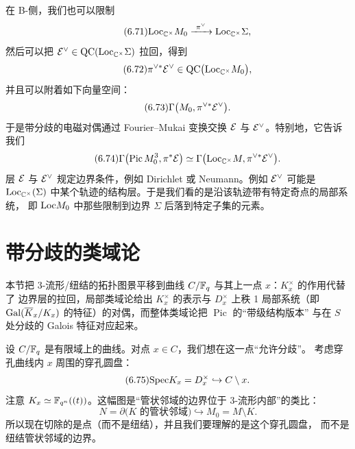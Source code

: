 在 B-侧，我们也可以限制
\begin{equation}\tag{6.71}\label{eq:6.71}
\Loc_{\C^{\times}}M_0\xrightarrow{\ \pi^{\vee}\ }\Loc_{\C^{\times}}\Sigma,
\end{equation}
然后可以把 $\mathcal{E}^{\vee}\in\mathrm{QC}(\mathrm{Loc}_{\mathbb{C}^{\times}}\Sigma)$ 拉回，得到
\begin{equation}\tag{6.72}\label{eq:6.72}
\pi^{\vee*}\mathcal{E}^{\vee}\in\mathrm{QC}\bigl(\mathrm{Loc}_{\mathbb{C}^{\times}}M_0\bigr),
\end{equation}
并且可以附着如下向量空间：
\begin{equation}\tag{6.73}\label{eq:6.73}
\Gamma\bigl(M_0,\pi^{\vee*}\mathcal{E}^{\vee}\bigr).
\end{equation}
于是带分歧的电磁对偶通过 Fourier--Mukai 变换交换 $\mathcal{E}$ 与 $\mathcal{E}^{\vee}$。特别地，它告诉我们
\begin{equation}\tag{6.74}\label{eq:6.74}
\Gamma\bigl(\operatorname{Pic}M_0^3,\pi^*\mathcal{E}\bigr)
\simeq\Gamma\bigl(\mathrm{Loc}_{\mathbb{C}^{\times}}M,\pi^{\vee*}\mathcal{E}^{\vee}\bigr).
\end{equation}
层 $\mathcal{E}$ 与 $\mathcal{E}^{\vee}$ 规定边界条件，例如 Dirichlet 或 Neumann。例如 $\mathcal{E}^{\vee}$ 可能是
$\mathrm{Loc}_{\mathbb{C}^{\times}}(\Sigma)$ 中某个轨迹的结构层。于是我们看的是沿该轨迹带有特定奇点的局部系统，
即 $\mathrm{Loc} M_0$ 中那些限制到边界 $\Sigma$ 后落到特定子集的元素。


\section{带分歧的类域论}

\begin{sectionkey}
本节把 3-流形/纽结的拓扑图景平移到曲线 $C/\mathbb{F}_q$ 与其上一点 $x$：$K_x^\times$ 的作用代替了
边界层的拉回，局部类域论给出 $K_x^\times$ 的表示与 $D_x^\times$ 上秩 1 局部系统（即
$\mathrm{Gal}(\overline{K}_x/K_x)$ 的特征）的对偶，而整体类域论把 $\operatorname{Pic}$ 的“带级结构版本”
与在 $S$ 处分歧的 Galois 特征对应起来。
\end{sectionkey}

设 $C/\mathbb{F}_q$ 是有限域上的曲线。对点 $x\in C$，我们想在这一点“允许分歧”。
考虑穿孔曲线内 $x$ 周围的穿孔圆盘：
\begin{equation}\tag{6.75}\label{eq:6.75}
\mathrm{Spec} K_x=D_x^{\times}\hookrightarrow C\setminus x .
\end{equation}
注意 $K_x\simeq \mathbb{F}_{q^n}((t))$。这幅图是“管状邻域的边界位于 3-流形内部”的类比：
\begin{equation}\tag{6.76}\label{eq:6.76}
N=\partial\bigl(\text{$K$ 的管状邻域}\bigr)\hookrightarrow M_0=M\setminus K .
\end{equation}
所以现在切除的是点（而不是纽结），并且我们要理解的是这个穿孔圆盘，
而不是纽结管状邻域的边界。

